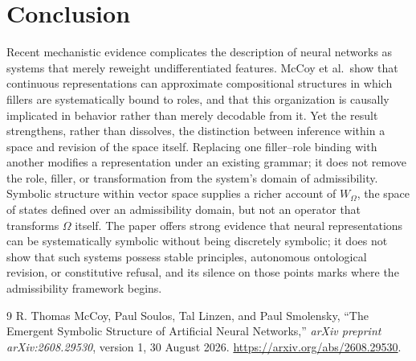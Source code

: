 \documentclass[11pt]{article}
\begin{document}
\section{Conclusion}

Recent mechanistic evidence complicates the description of neural networks as systems that merely reweight undifferentiated features. McCoy et al.\ show that continuous representations can approximate compositional structures in which fillers are systematically bound to roles, and that this organization is causally implicated in behavior rather than merely decodable from it. Yet the result strengthens, rather than dissolves, the distinction between inference within a space and revision of the space itself. Replacing one filler--role binding with another modifies a representation under an existing grammar; it does not remove the role, filler, or transformation from the system's domain of admissibility. Symbolic structure within vector space supplies a richer account of $W_\Omega$, the space of states defined over an admissibility domain, but not an operator that transforms $\Omega$ itself. The paper offers strong evidence that neural representations can be systematically symbolic without being discretely symbolic; it does not show that such systems possess stable principles, autonomous ontological revision, or constitutive refusal, and its silence on those points marks where the admissibility framework begins.

\begin{thebibliography}{9}
R. Thomas McCoy, Paul Soulos, Tal Linzen, and Paul Smolensky,
``The Emergent Symbolic Structure of Artificial Neural Networks,''
\emph{arXiv preprint arXiv:2608.29530}, version 1, 30 August 2026.
\url{https://arxiv.org/abs/2608.29530}.
\end{thebibliography}
\end{document}
